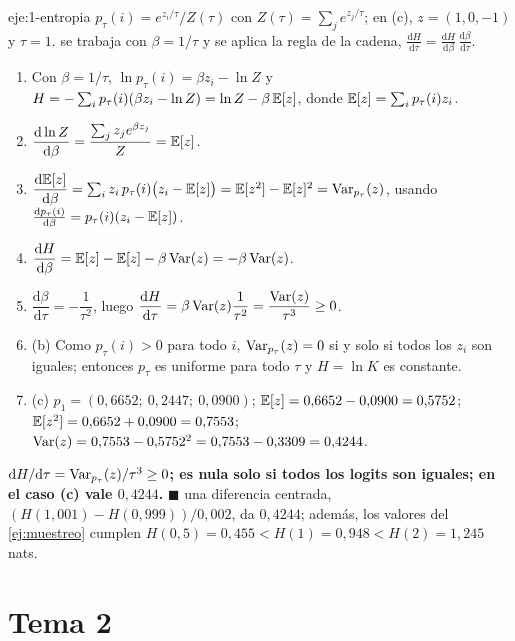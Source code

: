 \begin{solucion}{eje:1-entropia}
\datos $p_\tau(i)=e^{z_i/\tau}/Z(\tau)$ con $Z(\tau)=\sum_je^{z_j/\tau}$; en (c), $z=(1,0,-1)$ y $\tau=1$.
\planteamiento se trabaja con $\beta=1/\tau$ y se aplica la regla de la cadena, $\frac{\mathrm{d}H}{\mathrm{d}\tau}=\frac{\mathrm{d}H}{\mathrm{d}\beta}\,\frac{\mathrm{d}\beta}{\mathrm{d}\tau}$.
\pasos
\begin{enumerate}[label=\arabic*.]
  \item Con $\beta=1/\tau$, $\ln p_\tau(i)=\beta z_i-\ln Z$ y $H=-\sum_ip_\tau(i)(\beta z_i-\ln Z)=\ln Z-\beta\,\mathbb{E}[z]$, donde $\mathbb{E}[z]=\sum_i p_\tau(i)z_i$.
  \item $\dfrac{\mathrm{d}\ln Z}{\mathrm{d}\beta}=\dfrac{\sum_jz_je^{\beta z_j}}{Z}=\mathbb{E}[z]$.
  \item $\dfrac{\mathrm{d}\mathbb{E}[z]}{\mathrm{d}\beta}=\sum_iz_i\,p_\tau(i)\bigl(z_i-\mathbb{E}[z]\bigr)=\mathbb{E}[z^{2}]-\mathbb{E}[z]^{2}=\operatorname{Var}_{p_\tau}(z)$, usando $\frac{\mathrm{d}p_\tau(i)}{\mathrm{d}\beta}=p_\tau(i)(z_i-\mathbb{E}[z])$.
  \item $\dfrac{\mathrm{d}H}{\mathrm{d}\beta}=\mathbb{E}[z]-\mathbb{E}[z]-\beta\operatorname{Var}(z)=-\beta\operatorname{Var}(z)$.
  \item $\dfrac{\mathrm{d}\beta}{\mathrm{d}\tau}=-\dfrac{1}{\tau^{2}}$, luego $\dfrac{\mathrm{d}H}{\mathrm{d}\tau}=\beta\operatorname{Var}(z)\dfrac{1}{\tau^{2}}=\dfrac{\operatorname{Var}(z)}{\tau^{3}}\ge 0$.
  \item (b) Como $p_\tau(i)>0$ para todo $i$, $\operatorname{Var}_{p_\tau}(z)=0$ si y solo si todos los $z_i$ son iguales; entonces $p_\tau$ es uniforme para todo $\tau$ y $H=\ln K$ es constante.
  \item (c) $p_1=(0{,}6652;\allowbreak\ 0{,}2447;\allowbreak\ 0{,}0900)$; $\mathbb{E}[z]=0{,}6652-0{,}0900=0{,}5752$; $\mathbb{E}[z^{2}]=0{,}6652+0{,}0900=0{,}7553$; $\operatorname{Var}(z)=0{,}7553-0{,}5752^{2}=0{,}7553-0{,}3309=0{,}4244$.
\end{enumerate}
\resultado \textbf{$\mathrm{d}H/\mathrm{d}\tau=\operatorname{Var}_{p_\tau}(z)/\tau^{3}\ge 0$; es nula solo si todos los logits son iguales; en el caso (c) vale $0{,}4244$.} \hfill$\blacksquare$
\comprobacion una diferencia centrada, $(H(1{,}001)-H(0{,}999))/0{,}002$, da $0{,}4244$; además, los valores del \cref{ej:muestreo} cumplen $H(0{,}5)=0{,}455<H(1)=0{,}948<H(2)=1{,}245$ nats.
\end{solucion}

\section{Tema 2}

